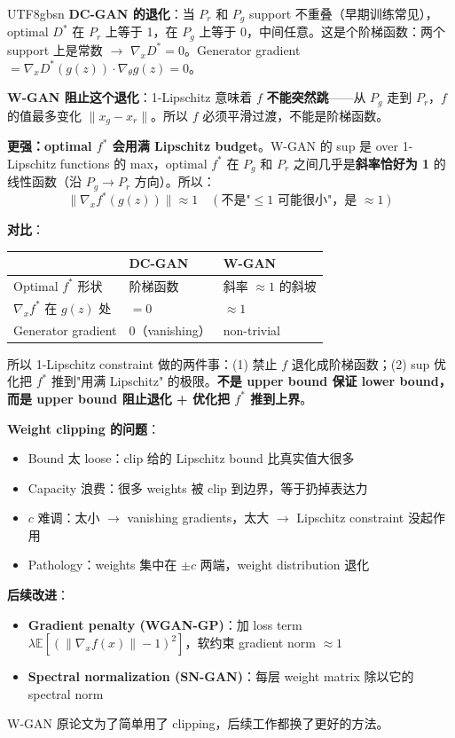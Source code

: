 \documentclass[11pt]{article}
\begin{document}
\begin{CJK}{UTF8}{gbsn}
\textbf{DC-GAN 的退化}：当 $P_r$ 和 $P_g$ support 不重叠（早期训练常见），optimal $D^*$ 在 $P_r$ 上等于 1，在 $P_g$ 上等于 0，中间任意。这是个阶梯函数：两个 support 上是常数 $\to$ $\nabla_x D^* = 0$。Generator gradient $= \nabla_x D^*(g(z)) \cdot \nabla_\theta g(z) = 0$。

\textbf{W-GAN 阻止这个退化}：1-Lipschitz 意味着 $f$ \textbf{不能突然跳}——从 $P_g$ 走到 $P_r$，$f$ 的值最多变化 $\|x_g - x_r\|$。所以 $f$ 必须平滑过渡，不能是阶梯函数。

\textbf{更强：optimal $f^*$ 会用满 Lipschitz budget}。W-GAN 的 sup 是 over 1-Lipschitz functions 的 max，optimal $f^*$ 在 $P_g$ 和 $P_r$ 之间几乎是\textbf{斜率恰好为 1} 的线性函数（沿 $P_g \to P_r$ 方向）。所以：
\[
\|\nabla_x f^*(g(z))\| \approx 1 \quad (\text{不是"} \leq 1 \text{ 可能很小"，是 } \approx 1)
\]

\textbf{对比}：

\begin{center}
\begin{tabular}{|l|l|l|}
\hline
 & DC-GAN & W-GAN \\
\hline
Optimal $f^*$ 形状 & 阶梯函数 & 斜率 $\approx 1$ 的斜坡 \\
$\nabla_x f^*$ 在 $g(z)$ 处 & $= 0$ & $\approx 1$ \\
Generator gradient & $0$（vanishing） & non-trivial \\
\hline
\end{tabular}
\end{center}

所以 1-Lipschitz constraint 做的两件事：(1) 禁止 $f$ 退化成阶梯函数；(2) sup 优化把 $f^*$ 推到"用满 Lipschitz" 的极限。\textbf{不是 upper bound 保证 lower bound，而是 upper bound 阻止退化 + 优化把 $f^*$ 推到上界}。

\textbf{Weight clipping 的问题}：
\begin{itemize}[nosep]
  \item Bound 太 loose：clip 给的 Lipschitz bound 比真实值大很多
  \item Capacity 浪费：很多 weights 被 clip 到边界，等于扔掉表达力
  \item $c$ 难调：太小 $\to$ vanishing gradients，太大 $\to$ Lipschitz constraint 没起作用
  \item Pathology：weights 集中在 $\pm c$ 两端，weight distribution 退化
\end{itemize}

\textbf{后续改进}：
\begin{itemize}[nosep]
  \item \textbf{Gradient penalty (WGAN-GP)}：加 loss term $\lambda \mathbb{E}[(\|\nabla_x f(x)\| - 1)^2]$，软约束 gradient norm $\approx 1$
  \item \textbf{Spectral normalization (SN-GAN)}：每层 weight matrix 除以它的 spectral norm
\end{itemize}
W-GAN 原论文为了简单用了 clipping，后续工作都换了更好的方法。


\end{CJK}
\end{document}
